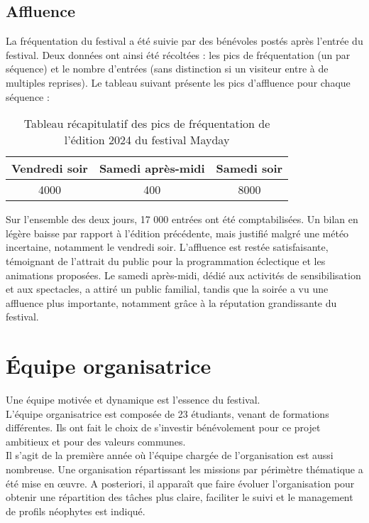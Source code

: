 \documentclass[12pt,a4paper]{report}
\begin{document}
\section{Affluence}
La fréquentation du festival a été suivie par des bénévoles postés après l'entrée du festival. Deux données ont ainsi été récoltées : les pics de fréquentation (un par séquence) et le nombre d'entrées (sans distinction si un visiteur entre à de multiples reprises). Le tableau suivant présente les pics d'affluence pour chaque séquence :
\begin{table}[h!]
\centering
\begin{tabular}{|c|c|c|}
\hline
Vendredi soir & Samedi après-midi & Samedi soir \\
\hline
4000 & 400 & 8000\\
\hline
\end{tabular}
\caption{Tableau récapitulatif des pics de fréquentation de l'édition 2024 du festival Mayday}
\end{table}

Sur l'ensemble des deux jours, 17 000 entrées ont été comptabilisées. Un bilan en légère baisse par rapport à l'édition précédente, mais justifié malgré une météo incertaine, notamment le vendredi soir. L'affluence est restée satisfaisante, témoignant de l'attrait du public pour la programmation éclectique et les animations proposées. Le samedi après-midi, dédié aux activités de sensibilisation et aux spectacles, a attiré un public familial, tandis que la soirée a vu une affluence plus importante, notamment grâce à la réputation grandissante du festival.

\chapter{Équipe organisatrice}

Une équipe motivée et dynamique est l'essence du festival.\\

L’équipe organisatrice est composée de 23 étudiants, venant de formations différentes. Ils ont fait le choix de s’investir bénévolement pour ce projet ambitieux et pour des valeurs communes.\\

Il s'agit de la première année où l'équipe chargée de l'organisation est aussi nombreuse. Une organisation répartissant les missions par périmètre thématique a été mise en œuvre. A posteriori, il apparaît que faire évoluer l'organisation pour obtenir une répartition des tâches plus claire, faciliter le suivi et le management de profils néophytes est indiqué.\\
\end{document}
